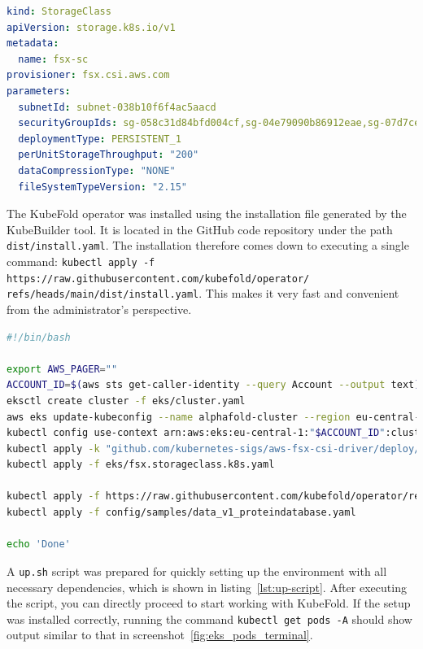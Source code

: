 \begin{lstlisting}[language=yaml,caption={Definition of \texttt{StorageClass} for FSx CSI Driver},label={lst:storage-class}]
kind: StorageClass
apiVersion: storage.k8s.io/v1
metadata:
  name: fsx-sc
provisioner: fsx.csi.aws.com
parameters:
  subnetId: subnet-038b10f6f4ac5aacd
  securityGroupIds: sg-058c31d84bfd004cf,sg-04e79090b86912eae,sg-07d7ceb3fa050568c,sg-02a2a067c7f724318
  deploymentType: PERSISTENT_1
  perUnitStorageThroughput: "200"
  dataCompressionType: "NONE"
  fileSystemTypeVersion: "2.15"
\end{lstlisting}

The KubeFold operator was installed using the installation file generated by the KubeBuilder tool.
It is located in the GitHub code repository under the path \texttt{dist/install.yaml}.
The installation therefore comes down to executing a single command: \texttt{kubectl apply -f https://raw.githubusercontent.com/kubefold/operator/ \n refs/heads/main/dist/install.yaml}.
This makes it very fast and convenient from the administrator's perspective.

\begin{lstlisting}[language=bash,caption={Quick project startup script},label={lst:up-script}]
#!/bin/bash

export AWS_PAGER=""
ACCOUNT_ID=$(aws sts get-caller-identity --query Account --output text)
eksctl create cluster -f eks/cluster.yaml
aws eks update-kubeconfig --name alphafold-cluster --region eu-central-1
kubectl config use-context arn:aws:eks:eu-central-1:"$ACCOUNT_ID":cluster/alphafold-cluster
kubectl apply -k "github.com/kubernetes-sigs/aws-fsx-csi-driver/deploy/kubernetes/overlays/stable/?ref=release-1.3"
kubectl apply -f eks/fsx.storageclass.k8s.yaml

kubectl apply -f https://raw.githubusercontent.com/kubefold/operator/refs/heads/main/dist/install.yaml
kubectl apply -f config/samples/data_v1_proteindatabase.yaml

echo 'Done'
\end{lstlisting}

A \texttt{up.sh} script was prepared for quickly setting up the environment with all necessary dependencies, which is shown in listing~\ref{lst:up-script}.
After executing the script, you can directly proceed to start working with KubeFold.
If the setup was installed correctly, running the command \texttt{kubectl get pods -A} should show output similar to that in screenshot~\ref{fig:eks_pods_terminal}.

